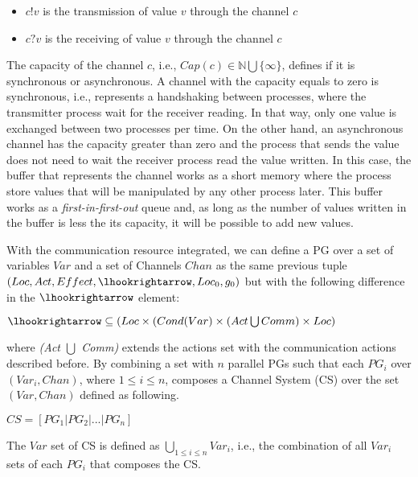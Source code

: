 \begin{itemize}
	\item $c!v$ is the transmission of value $v$ through the channel $c$ 
	\item $c?v$ is the receiving of value $v$ through the channel $c$
\end{itemize}

The capacity of the channel $c$, i.e., $Cap(c) \in \mathbb{N} \bigcup \{\infty\}$, defines if it is synchronous or asynchronous. A channel with the capacity equals to zero is synchronous, i.e., represents a handshaking between processes, where the transmitter process wait for the receiver reading. In that way, only one value is exchanged between two processes per time. On the other hand, an asynchronous channel has the capacity greater than zero and the process that sends the value does not need to wait the receiver process read the value written. In this case, the buffer that represents the channel works as a short memory where the process store values that will be manipulated by any other process later. This buffer works as a \textit{first-in-first-out} queue and, as long as the number of values written in the buffer is less the its capacity, it will be possible to add new values. 

With the communication resource integrated, we can define a PG over a set of variables $Var$ and a set of Channels $Chan$ as the same previous tuple $(Loc,Act,Effect,\lhookrightarrow,Loc_0,g_0)$ but with the following difference in the $\lhookrightarrow$ element:

\begin{center}
    $\lhookrightarrow \subseteq (Loc \times (Cond(Var) \times (Act \bigcup Comm) \times Loc)$
\end{center}

where \textit{(Act $\bigcup$ Comm)} extends the actions set with the communication actions described before. By combining a set with $n$ parallel PGs such that each $PG_i$ over $(Var_i, Chan)$, where $1 \leq i \leq n$, composes a Channel System (CS) over the set $(Var, Chan)$ defined as following.

\begin{center}
    $CS=[PG_1 | PG_2 | ... | PG_n]$
\end{center}

The $Var$ set of CS is defined as $\bigcup_{1 \leq i \leq n}Var_i$, i.e., the combination of all $Var_i$ sets of each $PG_i$ that composes the CS.

